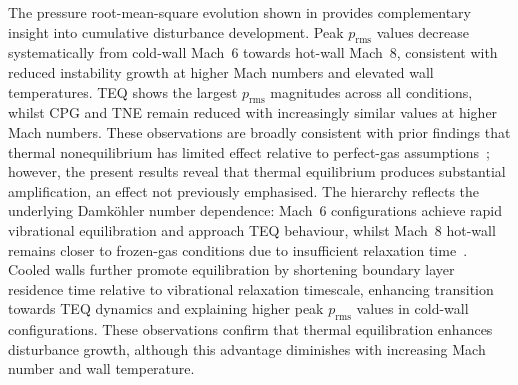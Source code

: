 The pressure root-mean-square evolution shown in  provides complementary insight into cumulative disturbance development. Peak $p_{\text{rms}}$ values decrease systematically from cold-wall Mach~6 towards hot-wall Mach~8, consistent with reduced instability growth at higher Mach numbers and elevated wall temperatures. \gls{TEQ} shows the largest $p_{\text{rms}}$ magnitudes across all conditions, whilst \gls{CPG} and \gls{TNE} remain reduced with increasingly similar values at higher Mach numbers. These observations are broadly consistent with prior findings that thermal nonequilibrium has limited effect relative to perfect-gas assumptions~\citep{BitterShepherd2015}; however, the present results reveal that thermal equilibrium produces substantial amplification, an effect not previously emphasised. The hierarchy reflects the underlying Damköhler number dependence: Mach~6 configurations achieve rapid vibrational equilibration and approach \gls{TEQ} behaviour, whilst Mach~8 hot-wall remains closer to frozen-gas conditions due to insufficient relaxation time~\citep{KlineEtAl2018}. Cooled walls further promote equilibration by shortening boundary layer residence time relative to vibrational relaxation timescale, enhancing transition towards \gls{TEQ} dynamics and explaining higher peak $p_{\text{rms}}$ values in cold-wall configurations. These observations confirm that thermal equilibration enhances disturbance growth, although this advantage diminishes with increasing Mach number and wall temperature.







